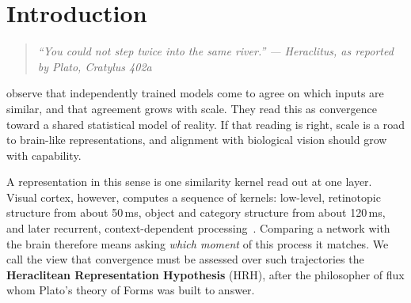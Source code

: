 \documentclass[10pt]{article}
\theoremstyle{plain}
\theoremstyle{definition}
\theoremstyle{remark}
\begin{document}
\section{Introduction}
\label{sec:intro}

\begin{quote}\small\itshape
  ``You could not step twice into the same river.''\hfill
  \textup{--- Heraclitus, as reported by Plato, \emph{Cratylus} 402a~\citep{plato_cratylus}}
\end{quote}

\noindent
\citet{huh2024platonic} observe that independently trained models come to agree on which inputs
are similar, and that agreement grows with scale. They read this as convergence toward a shared
statistical model of reality. If that reading is right, scale is a road to brain-like
representations, and alignment with biological vision should grow with capability.

A representation in this sense is one similarity kernel read out at one layer. Visual cortex,
however, computes a sequence of kernels: low-level, retinotopic structure from about 50\,ms,
object and category structure from about 120\,ms, and later recurrent, context-dependent
processing~\citep{cichy2016comparison,kietzmann2019recurrence,kar2019recurrent}. Comparing a
network with the brain therefore means asking \emph{which moment} of this process it matches.
We call the view that convergence must be assessed over such trajectories the
\textbf{Heraclitean Representation Hypothesis} (HRH), after the philosopher of flux whom Plato's
theory of Forms was built to answer.
\end{document}
